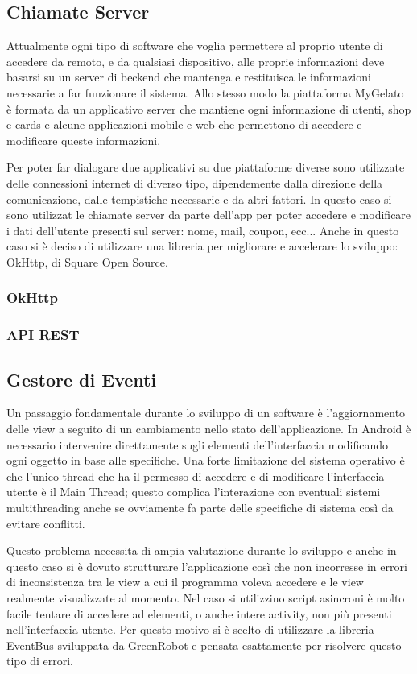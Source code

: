 \subsection{Chiamate Server}
Attualmente ogni tipo di software che voglia permettere al proprio utente di accedere da remoto, e da qualsiasi dispositivo, alle proprie informazioni deve basarsi su un server di beckend che mantenga e restituisca le informazioni necessarie a far funzionare il sistema.
Allo stesso modo la piattaforma MyGelato è formata da un applicativo server che mantiene ogni informazione di utenti, shop e cards e alcune applicazioni mobile e web che permettono di accedere e modificare queste informazioni.

Per poter far dialogare due applicativi su due piattaforme diverse sono utilizzate delle connessioni internet di diverso tipo, dipendemente dalla direzione della comunicazione, dalle tempistiche necessarie e da altri fattori.
In questo caso si sono utilizzat le chiamate server da parte dell'app per poter accedere e modificare i dati dell'utente presenti sul server: nome, mail, coupon, ecc...
Anche in questo caso si è deciso di utilizzare una libreria per migliorare e accelerare lo sviluppo: OkHttp, di Square Open Source.


\subsubsection{OkHttp}

\subsubsection{API REST}

\subsection{Gestore di Eventi}
Un passaggio fondamentale durante lo sviluppo di un software è l'aggiornamento delle view a seguito di un cambiamento nello stato dell'applicazione.
In Android è necessario intervenire direttamente sugli elementi dell'interfaccia modificando ogni oggetto in base alle specifiche.
Una forte limitazione del sistema operativo è che l'unico thread che ha il permesso di accedere e di modificare l'interfaccia utente è il Main Thread; questo complica l'interazione con eventuali sistemi multithreading anche se ovviamente fa parte delle specifiche di sistema così da evitare conflitti.

Questo problema necessita di ampia valutazione durante lo sviluppo e anche in questo caso si è dovuto strutturare l'applicazione così che non incorresse in errori di inconsistenza tra le view a cui il programma voleva accedere e le view realmente visualizzate al momento.
Nel caso si utilizzino script asincroni è molto facile tentare di accedere ad elementi, o anche intere activity, non più presenti nell'interfaccia utente.
Per questo motivo si è scelto di utilizzare la libreria EventBus sviluppata da GreenRobot \autocite{GITHUB:EVENTBUS} e pensata esattamente per risolvere questo tipo di errori.

